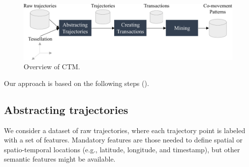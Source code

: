 \documentclass[
]{ceurart}
\begin{document}


\begin{figure}[t]
    \centering
    \includegraphics[scale=.7]{overview.pdf}
    \caption{Overview of CTM.}
    \label{fig:overview}
\end{figure}

Our approach is based on the following steps ().

\subsection{Abstracting trajectories}

We consider a dataset of raw trajectories, where each trajectory point is labeled with a set of features.
Mandatory features are those needed to define spatial or spatio-temporal locations (e.g., latitude, longitude, and timestamp), but other semantic features might be available.%
\end{document}
